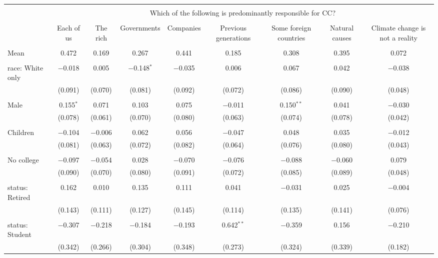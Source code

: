 
\begin{tabular}{@{\extracolsep{5pt}}lcccccccc} 
\\[-1.8ex]\hline 
\hline \\[-1.8ex] 
 & \multicolumn{8}{c}{Which of the following is predominantly responsible for CC?} \\ 
\cline{2-9} 
\\[-1.8ex] & Each of us & The rich & Governments & Companies & Previous generations & Some foreign countries & Natural causes & Climate change is not a reality \\ 
\hline \\[-1.8ex] 
 Mean & 0.472 & 0.169 & 0.267 & 0.441 & 0.185 & 0.308 & 0.395 & 0.072  \\ \hline \\[-1.8ex] race: White only & $-$0.018 & 0.005 & $-$0.148$^{*}$ & $-$0.035 & 0.006 & 0.067 & 0.042 & $-$0.038 \\ 
  & (0.091) & (0.070) & (0.081) & (0.092) & (0.072) & (0.086) & (0.090) & (0.048) \\ 
  & & & & & & & & \\ 
 Male & 0.155$^{*}$ & 0.071 & 0.103 & 0.075 & $-$0.011 & 0.150$^{**}$ & 0.041 & $-$0.030 \\ 
  & (0.078) & (0.061) & (0.070) & (0.080) & (0.063) & (0.074) & (0.078) & (0.042) \\ 
  & & & & & & & & \\ 
 Children & $-$0.104 & $-$0.006 & 0.062 & 0.056 & $-$0.047 & 0.048 & 0.035 & $-$0.012 \\ 
  & (0.081) & (0.063) & (0.072) & (0.082) & (0.064) & (0.076) & (0.080) & (0.043) \\ 
  & & & & & & & & \\ 
 No college & $-$0.097 & $-$0.054 & 0.028 & $-$0.070 & $-$0.076 & $-$0.088 & $-$0.060 & 0.079 \\ 
  & (0.090) & (0.070) & (0.080) & (0.091) & (0.072) & (0.085) & (0.089) & (0.048) \\ 
  & & & & & & & & \\ 
 status: Retired & 0.162 & 0.010 & 0.135 & 0.111 & 0.041 & $-$0.031 & 0.025 & $-$0.004 \\ 
  & (0.143) & (0.111) & (0.127) & (0.145) & (0.114) & (0.135) & (0.141) & (0.076) \\ 
  & & & & & & & & \\ 
 status: Student & $-$0.307 & $-$0.218 & $-$0.184 & $-$0.193 & 0.642$^{**}$ & $-$0.359 & 0.156 & $-$0.210 \\ 
  & (0.342) & (0.266) & (0.304) & (0.348) & (0.273) & (0.324) & (0.339) & (0.182) \\ 

\end{tabular}
